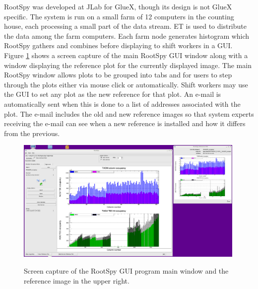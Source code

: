 RootSpy was developed at JLab for GlueX, though its design is not GlueX specific. The system is run on a small farm of 12 computers in the counting house, each processing a small part of the data stream. ET is used to distribute the data among the farm computers. Each farm node generates histogram which RootSpy gathers and combines before displaying to shift workers in a GUI. Figure \ref{fig:online_monitoring_rootspy} shows a screen capture of the main RootSpy GUI window along with a window displaying the reference plot for the currently displayed image. The main RootSpy window allows plots to be grouped into tabs and for users to step through the plots either via mouse click or automatically. Shift workers may use the GUI to set any plot as the new reference for that plot. An e-mail is automatically sent when this is done to a list of addresses associated with the plot. The e-mail includes the old and new reference images so that system experts receiving the e-mail can see when a new reference is installed and how it differs from the previous.

\begin{figure}[tbp]
\begin{center}
\includegraphics[width=0.99\textwidth]{figures/online_monitoring_rootspy.png}
\label{fig:online_monitoring_rootspy}
\caption{Screen capture of the RootSpy GUI program main window and the reference image in the upper right.}   
\end{center}  
\end{figure}

